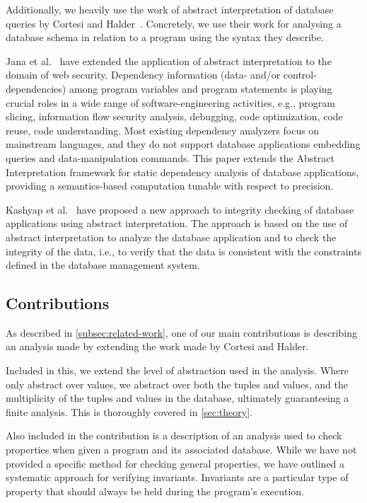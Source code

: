 Additionally, we heavily use the work of abstract interpretation of database queries by Cortesi and Halder~\cite{halder_abstract_2012}.
Concretely, we use their work for analysing a database schema in relation to a program using the syntax they describe.

Jana et al.~\cite{jana_extending_2020} have extended the application of abstract interpretation to the domain of web security.
Dependency information (data- and/or control-dependencies) among program variables and program statements is playing crucial roles in a wide range of software-engineering activities, e.g., program slicing, information flow security analysis, debugging, code optimization, code reuse, code understanding.
Most existing dependency analyzers focus on mainstream languages, and they do not support database applications embedding queries and data-manipulation commands.
This paper extends the Abstract Interpretation framework for static dependency analysis of database applications, providing a semantics-based computation tunable with respect to precision.

Kashyap et al.~\cite{kashyap_integrity_2022} have proposed a new approach to integrity checking of database applications using abstract interpretation.
The approach is based on the use of abstract interpretation to analyze the database application and to check the integrity of the data, i.e., to verify that the data is consistent with the constraints defined in the database management system.


\subsection{Contributions}\label{subsec:contributions}
As described in \autoref{subsec:related-work}, one of our main contributions is describing an analysis made by extending the work made by Cortesi and Halder.

Included in this, we extend the level of abstraction used in the analysis.
Where~\cite{halder_abstract_2012} only abstract over values, we abstract over both the tuples and values, and the multiplicity of the tuples and values in the database, ultimately guaranteeing a finite analysis.
This is thoroughly covered in \autoref{sec:theory}.

Also included in the contribution is a description of an analysis used to check properties when given a program and its associated database.
While we have not provided a specific method for checking general properties, we have outlined a systematic approach for verifying invariants.
Invariants are a particular type of property that should always be held during the program's execution.

